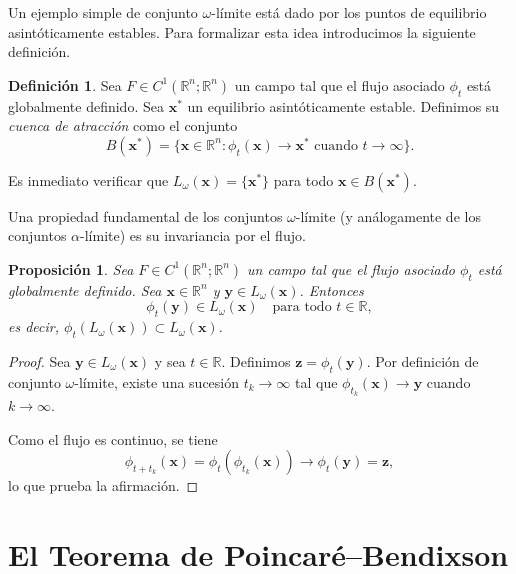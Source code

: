 \documentclass[12pt, a4paper]{amsbook}
\newcommand{\R}{{\mathbb R}}
\newcommand{\xx}{{\mathbf x}}
\newcommand{\yy}{{\mathbf y}}
\newcommand{\zz}{{\mathbf z}}
\newtheorem{prop}[teo]{Proposición}
\theoremstyle{remark}
\theoremstyle{definition}
\newtheorem{defi}[teo]{Definición}
\numberwithin{section}{chapter}
\numberwithin{subsection}{section}
\numberwithin{equation}{section}
\numberwithin{figure}{chapter}
\begin{document}
Un ejemplo simple de conjunto $\omega$-límite está dado por los puntos de equilibrio asintóticamente estables. Para formalizar esta idea introducimos la siguiente definición.

\begin{defi}
Sea $F\in C^1(\R^n;\R^n)$ un campo tal que el flujo asociado $\phi_t$ está globalmente definido. Sea $\xx^*$ un equilibrio asintóticamente estable. Definimos su {\em cuenca de atracción} como el conjunto
\[
B(\xx^*) = \{\xx\in\R^n\colon \phi_t(\xx)\to\xx^* \text{ cuando } t\to\infty\}.
\]
\end{defi}

Es inmediato verificar que $L_\omega(\xx)=\{\xx^*\}$ para todo $\xx\in B(\xx^*)$.

Una propiedad fundamental de los conjuntos $\omega$-límite (y análogamente de los conjuntos $\alpha$-límite) es su invariancia por el flujo.

\begin{prop}
Sea $F\in C^1(\R^n;\R^n)$ un campo tal que el flujo asociado $\phi_t$ está globalmente definido. Sea $\xx\in\R^n$ y $\yy\in L_\omega(\xx)$. Entonces
\[
\phi_t(\yy)\in L_\omega(\xx) \quad \text{para todo } t\in\R,
\]
es decir, $\phi_t(L_\omega(\xx))\subset L_\omega(\xx)$.
\end{prop}

\begin{proof}
Sea $\yy\in L_\omega(\xx)$ y sea $t\in\R$. Definimos $\zz=\phi_t(\yy)$. Por definición de conjunto $\omega$-límite, existe una sucesión $t_k\to\infty$ tal que $\phi_{t_k}(\xx)\to\yy$ cuando $k\to\infty$.

Como el flujo es continuo, se tiene
\[
\phi_{t+t_k}(\xx)=\phi_t(\phi_{t_k}(\xx))\to\phi_t(\yy)=\zz,
\]
lo que prueba la afirmación.
\end{proof}

\section{El Teorema de Poincaré--Bendixson}
\end{document}
